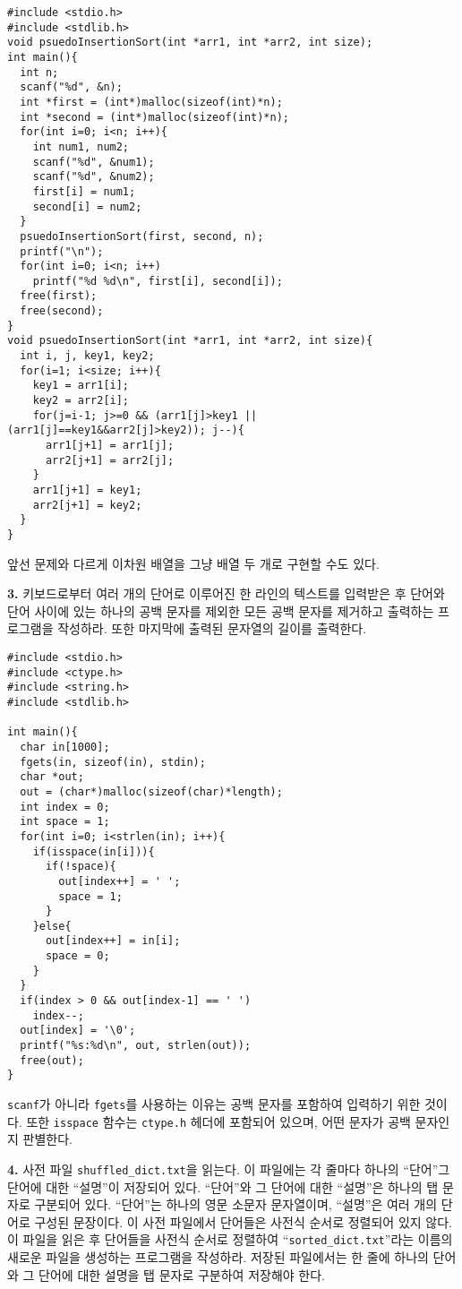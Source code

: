 \documentclass[a4paper,chapter,atbegshi]{oblivoir}
\begin{document}
\begin{lstlisting}[style=C]
#include <stdio.h>
#include <stdlib.h>
void psuedoInsertionSort(int *arr1, int *arr2, int size);
int main(){
  int n;
  scanf("%d", &n);
  int *first = (int*)malloc(sizeof(int)*n);
  int *second = (int*)malloc(sizeof(int)*n);
  for(int i=0; i<n; i++){
    int num1, num2;
    scanf("%d", &num1);
    scanf("%d", &num2);
    first[i] = num1;
    second[i] = num2;
  }
  psuedoInsertionSort(first, second, n);
  printf("\n");
  for(int i=0; i<n; i++)
    printf("%d %d\n", first[i], second[i]);
  free(first);
  free(second);
}
void psuedoInsertionSort(int *arr1, int *arr2, int size){
  int i, j, key1, key2;
  for(i=1; i<size; i++){
    key1 = arr1[i];
    key2 = arr2[i];
    for(j=i-1; j>=0 && (arr1[j]>key1 || (arr1[j]==key1&&arr2[j]>key2)); j--){
      arr1[j+1] = arr1[j];
      arr2[j+1] = arr2[j];
    }
    arr1[j+1] = key1;
    arr2[j+1] = key2;
  }
}
\end{lstlisting}
앞선 문제와 다르게 이차원 배열을 그냥 배열 두 개로 구현할 수도 있다.
\hfill\break
\begin{mdframed}\textbf{3. }
  키보드로부터 여러 개의 단어로 이루어진 한 라인의 텍스트를 입력받은 후
  단어와 단어 사이에 있는 하나의 공백 문자를 제외한 모든 공백 문자를 제거하고
  출력하는 프로그램을 작성하라. 또한 마지막에 출력된 문자열의 길이를 출력한다.
\end{mdframed}
\begin{lstlisting}[style=C]
#include <stdio.h>
#include <ctype.h>
#include <string.h>
#include <stdlib.h>

int main(){
  char in[1000];
  fgets(in, sizeof(in), stdin);
  char *out;
  out = (char*)malloc(sizeof(char)*length);
  int index = 0;
  int space = 1;
  for(int i=0; i<strlen(in); i++){
    if(isspace(in[i])){
      if(!space){
        out[index++] = ' ';
        space = 1;
      }
    }else{
      out[index++] = in[i];
      space = 0;
    }
  }
  if(index > 0 && out[index-1] == ' ')
    index--;
  out[index] = '\0';
  printf("%s:%d\n", out, strlen(out));
  free(out);
}
\end{lstlisting}
\texttt{scanf}가 아니라 \texttt{fgets}를 사용하는 이유는 공백 문자를 포함하여
입력하기 위한 것이다. 또한 \texttt{isspace} 함수는 \texttt{ctype.h} 헤더에
포함되어 있으며, 어떤 문자가 공백 문자인지 판별한다.
\hfill\break
\begin{mdframed}\textbf{4. }
  사전 파일 \texttt{shuffled\_dict.txt}을 읽는다. 이 파일에는 각 줄마다 하나의
  ``단어''그 단어에 대한 ``설명''이 저장되어 있다. ``단어''와 그 단어에 대한
  ``설명''은 하나의 탭 문자로 구분되어 있다. ``단어''는 하나의 영문 소문자
  문자열이며, ``설명''은 여러 개의 단어로 구성된 문장이다. 이 사전 파일에서
  단어들은 사전식 순서로 정렬되어 있지 않다. 이 파일을 읽은 후 단어들을 사전식
  순서로 정렬하여 ``\texttt{sorted\_dict.txt}''라는 이름의 새로운 파일을 생성하는
  프로그램을 작성하라. 저장된 파일에서는 한 줄에 하나의 단어와 그 단어에 대한
  설명을 탭 문자로 구분하여 저장해야 한다.
\end{mdframed}
\end{document}

